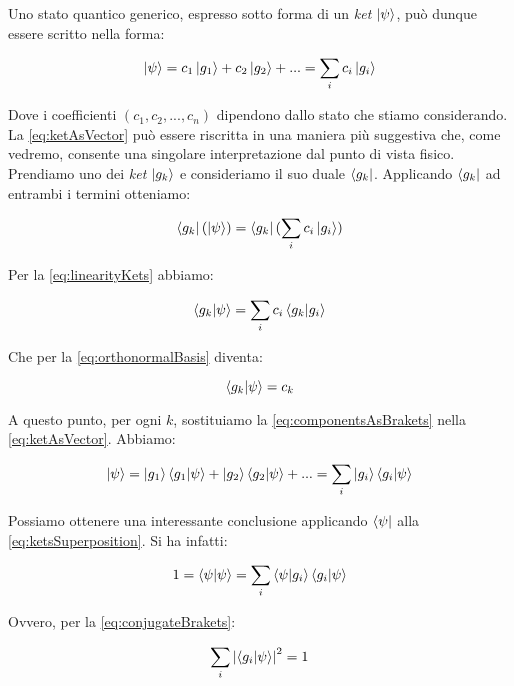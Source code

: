Uno stato quantico generico, espresso sotto forma di un \textit{ket} $\ket{\psi}$, può dunque essere scritto nella forma:

	\begin{equation} \label{eq:ketAsVector}
		\ket{\psi} = c_1 \ket{g_1} + c_2 \ket{g_2} + ... = \sum_i c_i \ket{g_i}
	\end{equation}

Dove i coefficienti $(c_1, c_2, ..., c_n)$ dipendono dallo stato che stiamo considerando. La \eqref{eq:ketAsVector} può essere riscritta in una maniera più suggestiva che, come vedremo, consente una singolare interpretazione dal punto di vista fisico. Prendiamo uno dei \textit{ket} $\ket{g_k}$ e consideriamo il suo duale $\bra{g_k}$. Applicando $\bra{g_k}$ ad entrambi i termini otteniamo:

	\begin{equation}
		\bra{g_k}(\ket{\psi}) = \bra{g_k}(\sum_i c_i \ket{g_i})
	\end{equation}

Per la \eqref{eq:linearityKets} abbiamo:

	\begin{equation}
		\braket{g_k}{\psi} = \sum_i c_i \braket{g_k}{g_i}
	\end{equation}

Che per la \eqref{eq:orthonormalBasis} diventa:

	\begin{equation} \label{eq:componentsAsBrakets}
		\braket{g_k}{\psi} = c_k
	\end{equation}

A questo punto, per ogni $k$, sostituiamo la \eqref{eq:componentsAsBrakets} nella \eqref{eq:ketAsVector}. Abbiamo:

	\begin{equation} \label{eq:ketsSuperposition}
		\ket{\psi} = \ket{g_1} \braket{g_1}{\psi} + \ket{g_2} \braket{g_2}{\psi} + ... = \sum_i \ket{g_i} \braket{g_i}{\psi}
	\end{equation}

Possiamo ottenere una interessante conclusione applicando $\bra{\psi}$ alla \eqref{eq:ketsSuperposition}. Si ha infatti:

	\begin{equation}
		1 = \braket{\psi}{\psi} = \sum_i \braket{\psi}{g_i} \braket{g_i}{\psi}
	\end{equation}

Ovvero, per la \eqref{eq:conjugateBrakets}:

	\begin{equation} \label{eq:probabilitySum}
		\sum_i \left | \braket{g_i}{\psi} \right |^2 = 1
	\end{equation}


